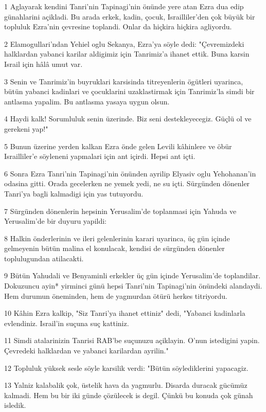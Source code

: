 \par 1 Aglayarak kendini Tanri'nin Tapinagi'nin önünde yere atan Ezra dua edip günahlarini açikladi. Bu arada erkek, kadin, çocuk, Israilliler'den çok büyük bir topluluk Ezra'nin çevresine toplandi. Onlar da hiçkira hiçkira agliyordu.
\par 2 Elamogullari'ndan Yehiel oglu Sekanya, Ezra'ya söyle dedi: "Çevremizdeki halklardan yabanci karilar aldigimiz için Tanrimiz'a ihanet ettik. Buna karsin Israil için hâlâ umut var.
\par 3 Senin ve Tanrimiz'in buyruklari karsisinda titreyenlerin ögütleri uyarinca, bütün yabanci kadinlari ve çocuklarini uzaklastirmak için Tanrimiz'la simdi bir antlasma yapalim. Bu antlasma yasaya uygun olsun.
\par 4 Haydi kalk! Sorumluluk senin üzerinde. Biz seni destekleyecegiz. Güçlü ol ve gerekeni yap!"
\par 5 Bunun üzerine yerden kalkan Ezra önde gelen Levili kâhinlere ve öbür Israilliler'e söyleneni yapmalari için ant içirdi. Hepsi ant içti.
\par 6 Sonra Ezra Tanri'nin Tapinagi'nin önünden ayrilip Elyasiv oglu Yehohanan'in odasina gitti. Orada gecelerken ne yemek yedi, ne su içti. Sürgünden dönenler Tanri'ya bagli kalmadigi için yas tutuyordu.
\par 7 Sürgünden dönenlerin hepsinin Yerusalim'de toplanmasi için Yahuda ve Yerusalim'de bir duyuru yapildi:
\par 8 Halkin önderlerinin ve ileri gelenlerinin karari uyarinca, üç gün içinde gelmeyenin bütün malina el konulacak, kendisi de sürgünden dönenler toplulugundan atilacakti.
\par 9 Bütün Yahudali ve Benyaminli erkekler üç gün içinde Yerusalim'de toplandilar. Dokuzuncu ayin* yirminci günü hepsi Tanri'nin Tapinagi'nin önündeki alandaydi. Hem durumun öneminden, hem de yagmurdan ötürü herkes titriyordu.
\par 10 Kâhin Ezra kalkip, "Siz Tanri'ya ihanet ettiniz" dedi, "Yabanci kadinlarla evlendiniz. Israil'in suçuna suç kattiniz.
\par 11 Simdi atalarinizin Tanrisi RAB'be suçunuzu açiklayin. O'nun istedigini yapin. Çevredeki halklardan ve yabanci karilardan ayrilin."
\par 12 Topluluk yüksek sesle söyle karsilik verdi: "Bütün söylediklerini yapacagiz.
\par 13 Yalniz kalabalik çok, üstelik hava da yagmurlu. Disarda duracak gücümüz kalmadi. Hem bu bir iki günde çözülecek is degil. Çünkü bu konuda çok günah isledik.
